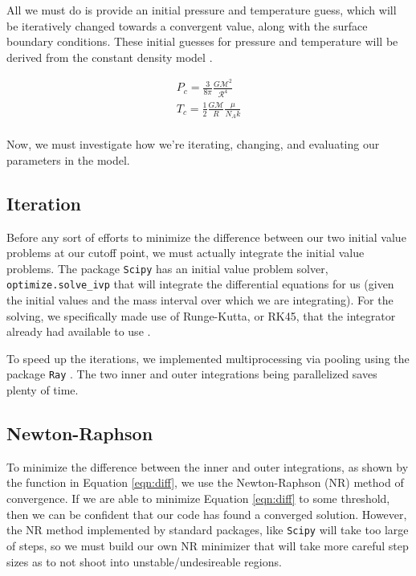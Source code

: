 \documentclass[twocolumn]{aastex631}
\begin{document}
All we must do is provide an initial pressure and temperature guess, which will be iteratively changed towards a convergent value, along with the surface boundary conditions. These initial guesses for pressure and temperature will be derived from the constant density model \citep{stelint}.

\begin{equation}
\boxed{
\begin{array}{lcl}
P_c = \frac{3}{8\pi}\frac{G\mathcal{M}^2}{\mathcal{R}^4}\\
T_c = \frac{1}{2}\frac{G\mathcal{M}}{R}\frac{\mu}{N_Ak}\\
\end{array}
}
\end{equation}

Now, we must investigate how we're iterating, changing, and evaluating our parameters in the model.

\subsection{Iteration}

Before any sort of efforts to minimize the difference between our two initial value problems at our cutoff point, we must actually integrate the initial value problems. The package \texttt{Scipy} has an initial value problem solver, \texttt{optimize.solve\_ivp} that will integrate the differential equations for us (given the initial values and the mass interval over which we are integrating). For the solving, we specifically made use of Runge-Kutta, or RK45, that the integrator already had available to use \citep{scipy}. 

To speed up the iterations, we implemented multiprocessing via pooling using the package \texttt{Ray} \citep{ray}. The two inner and outer integrations being parallelized saves plenty of time.

\subsection{Newton-Raphson}

To minimize the difference between the inner and outer integrations, as shown by the function in Equation \ref{eqn:diff}, we use the Newton-Raphson (NR) method of convergence. If we are able to minimize Equation \ref{eqn:diff} to some threshold, then we can be confident that our code has found a converged solution. However, the NR method implemented by standard packages, like \texttt{Scipy} will take too large of steps, so we must build our own NR minimizer that will take more careful step sizes as to not shoot into unstable/undesireable regions. 
\end{document}
